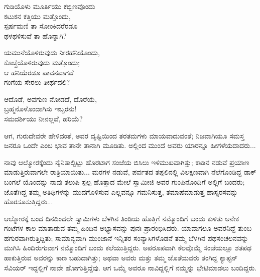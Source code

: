 \begin{myquote}
ಗುಡಿಯೊಳು ಮೂರ್ತಿಯು ಕಬ್ಬಿಣವೊಂದು\\ಕಟುಕನ ಕತ್ತಿಯು ಮತ್ತೊಂದು,\\ಸ್ಪರ್ಷಮಣಿ ತಾ ಸೋಂಕಿದರೆರಡೂ\\ಥಳಥಳಿಸುವೆ ತಾ ಹೊನ್ನಾಗಿ?
\end{myquote}

\begin{myquote}
ಯಮುನೆಯೊಳಿರುವುದು ನೀರಹನಿಯೊಂದು,\\ಕೊಚ್ಚೆಯೊಳಿರುವುದು ಮತ್ತೊಂದು;\\ಆ ಹನಿಯೆರಡೂ ಪಾವನವಾಗವೆ\\ಗಂಗೆಯ ಸೇರಲು ತೀರ್ಥದಲಿ?
\end{myquote}

\begin{myquote}
ಆದೊಡೆ, ಅವಗುಣ ನೋಡದೆ, ದೊರೆಯೆ,\\ಬ್ರಹ್ಮನೊಳೊಂದಾಗಿಸು ಇಬ್ಬರನು!\\ಸಮದರ್ಶಿಯು ನೀನಲ್ಲವೆ, ಹರಿಯೆ?
\end{myquote}

ಆಗ, ಗುರುದೇವರೇ ಹೇಳಿದಂತೆ, ಅವರ ದೃಷ್ಟಿಯಿಂದ ತರತಮಗಳು ಮಾಯವಾದುವಂತೆ; ನಿಜವಾಗಿಯೂ ಸಮಸ್ತ ಜನರೂ ಒಂದೇ ಎಂಬ ಭಾವ ತಾನೇ ತಾನಾಗಿ ಮೂಡಿತು. ಅಲ್ಲಿಂದ ಮುಂದೆ ಅವರು ಯಾರನ್ನೂ ಹೀಗಳೆಯದಾದರು...

ನಾವು ಆಲ್ಮೋರಕ್ಕೆಂದು ನೈನಿತಾಲ್ಬಿಟ್ಟು ಹೊರಟಾಗ ಸಂಜೆಯ ಬಿಸಿಲು ಇಳಿಮುಖವಾಗಿತ್ತು; ಕಾಡಿನ ನಡುವೆ ಪ್ರಯಾಣ ಮಾಡುತ್ತಿರುವಾಗಲೇ ರಾತ್ರಿಯಾಯಿತು... ಮರಗಳ ನಡುವೆ, ಪರ್ವತದ ತಪ್ಪಲಿನಲ್ಲಿ ವಿಲಕ್ಷಣವಾಗಿ ನೆಲೆಗೊಂಡಿದ್ದ ಡಾಕ್ ಬಂಗಲೆ ಯೊಂದನ್ನು ನಾವು ತಲುಪಿ ಸ್ಪಲ್ಪ ಹೊತ್ತಾದ ಮೇಲೆ ಸ್ವಾಮೀಜಿ ಅವರ ಗುಂಪಿನೊಂದಿಗೆ ಅಲ್ಲಿಗೆ ಬಂದರು; ಜೊತೆಗಿದ್ದ ತಮ್ಮ ಅತಿಥಿಗಳನ್ನು ಮುದಗೊಳಿಸುವ ಎಲ್ಲವನ್ನೂ ಗಮನಿಸುತ್ತ, ತಮಾಷೆಮಾಡುತ್ತ ಹಾಸ್ಯರಸವನ್ನು ಹೊರಸೂಸುತ್ತಿದ್ದರು...

ಆಲ್ಮೋರಕ್ಕೆ ಬಂದ ದಿನದಿಂದಲೇ ಸ್ವಾಮಿಗಳು ಬೆಳಗಿನ ತಿಂಡಿಯ ಹೊತ್ತಿಗೆ ನಮ್ಮೊಂದಿಗೆ ಬಂದು ಕುಳಿತು ಅನೇಕ ಗಂಟೆಗಳ ಕಾಲ ಮಾತಾಡುವ ತಮ್ಮ ಹಿಂದಿನ ಅಭ್ಯಾಸವನ್ನು ಪುನಃ ಪ್ರಾರಂಭಿಸಿದರು. ಯಾವಾಗಲೂ ಅವರನಿದ್ದೆ ತುಂಬ ಹಗುರವಾಗಿರುತ್ತಿದ್ದಿತು; ಸಾಮಾನ್ಯವಾಗಿ ಮುಂಜಾನೆ ಇನ್ನಿತರ ಸಂನ್ಯಾಸಿಗಳೊಡನೆ ತಮ್ಮ ಬೆಳಗಿನ ಪಥಸಂಚಲನವನ್ನು ಮುಗಿಸಿ ಹಿಂದಿರುಗುವಾಗ ನಮ್ಮೊಂದಿಗೆ ಬಂದು ಕಲೆಯುತ್ತಿದ್ದರು. ಅಪರೂಪವಾಗಿ ಕೆಲವೊಮ್ಮೆ ಸಂಜೆಯಲ್ಲೂ ಶತಪಥ ಹಾಕುತ್ತಿರುವ ಅವರನ್ನು ಕಾಣ ಬಹುದಾಗಿತ್ತು; ಅಥವಾ ಅವರು ಮತ್ತು ತಮ್ಮ ಜೊತೆಯವರು ತಂಗಿದ್ದ ಕ್ಯಾಪ್ಟನ್ ಸೆವಿಯರ್ ಇದ್ದಲ್ಲಿಗೆ ನಾವೇ ಹೋಗುತ್ತಿದ್ದೆವು. ಆಗ ಒಮ್ಮೆ ಅವರೂ ನಾವಿದ್ದಲ್ಲಿಗೆ ನಮ್ಮನ್ನು ಭೇಟಿಮಾಡಲು ಬಂದಿದ್ದರು.


